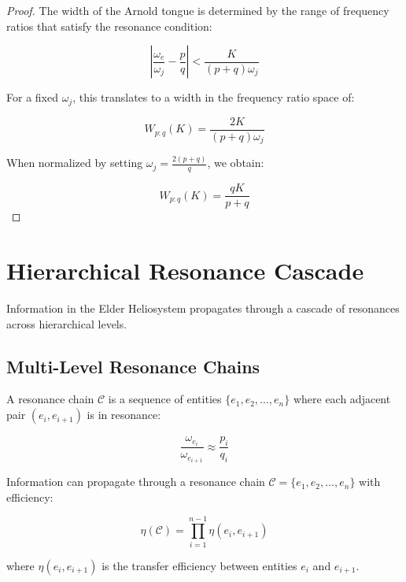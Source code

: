 \begin{proof}
The width of the Arnold tongue is determined by the range of frequency ratios that satisfy the resonance condition:

\begin{equation}
\left|\frac{\omega_e}{\omega_j} - \frac{p}{q}\right| < \frac{K}{(p+q)\omega_j}
\end{equation}

For a fixed $\omega_j$, this translates to a width in the frequency ratio space of:

\begin{equation}
W_{p:q}(K) = \frac{2K}{(p+q)\omega_j}
\end{equation}

When normalized by setting $\omega_j = \frac{2(p+q)}{q}$, we obtain:

\begin{equation}
W_{p:q}(K) = \frac{qK}{p+q}
\end{equation}
\end{proof}

\section{Hierarchical Resonance Cascade}

Information in the Elder Heliosystem propagates through a cascade of resonances across hierarchical levels.

\subsection{Multi-Level Resonance Chains}

\begin{definition}
A resonance chain $\mathcal{C}$ is a sequence of entities $\{e_1, e_2, \ldots, e_n\}$ where each adjacent pair $(e_i, e_{i+1})$ is in resonance:

\begin{equation}
\frac{\omega_{e_i}}{\omega_{e_{i+1}}} \approx \frac{p_i}{q_i}
\end{equation}
\end{definition}

\begin{theorem}
Information can propagate through a resonance chain $\mathcal{C} = \{e_1, e_2, \ldots, e_n\}$ with efficiency:

\begin{equation}
\eta(\mathcal{C}) = \prod_{i=1}^{n-1} \eta(e_i, e_{i+1})
\end{equation}

where $\eta(e_i, e_{i+1})$ is the transfer efficiency between entities $e_i$ and $e_{i+1}$.
\end{theorem}

